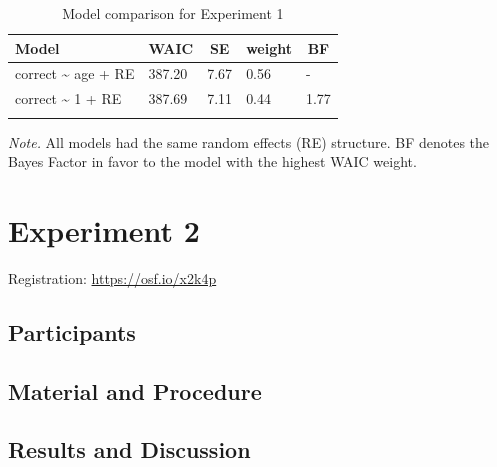 \documentclass[man,floatsintext]{apa6}
\begin{document}
\begin{table}[tbp]
\begin{center}
\begin{threeparttable}
\caption{\label{tab:table1}Model comparison for Experiment 1}
\begin{tabular}{lllll}
\toprule
Model & \multicolumn{1}{c}{WAIC} & \multicolumn{1}{c}{SE} & \multicolumn{1}{c}{weight} & \multicolumn{1}{c}{BF}\\
\midrule
correct \textasciitilde{} age + RE & 387.20 & 7.67 & 0.56 & -\\
correct \textasciitilde{} 1 + RE & 387.69 & 7.11 & 0.44 & 1.77\\
\bottomrule
\addlinespace
\end{tabular}
\begin{tablenotes}[para]
\normalsize{\textit{Note.} All models had the same random effects (RE) structure. BF denotes the Bayes Factor in favor to the model with the highest WAIC weight.}
\end{tablenotes}
\end{threeparttable}
\end{center}
\end{table}

\section{Experiment 2}\label{experiment-2}

Registration: \url{https://osf.io/x2k4p}

\subsection{Participants}\label{participants-1}

\subsection{Material and Procedure}\label{material-and-procedure}

\subsection{Results and Discussion}\label{results-and-discussion}
\end{document}
